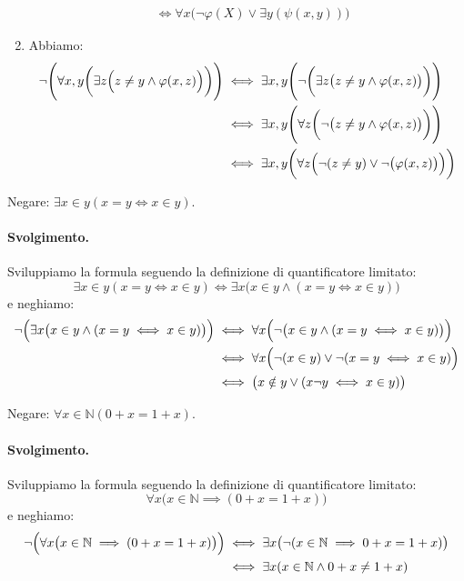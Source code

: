 \begin{enumerate}
\begin{align*}
		&\iff \forall x \biggl(  \neg \varphi(X) \lor \exists y (\psi(x,y)) \biggr)
	\end{align*}
	\item Abbiamo:
	\begin{align*}
		\neg \Biggl( \forall x,y \biggl( \exists z \Bigl( z \neq y \land \varphi(x,z) \Bigr) \biggr)   \Biggr)
		&\iff \exists x,y \Biggl( \neg \biggl( \exists z \bigl(z \neq y \land \varphi(x,z) \bigr)  \biggr)   \Biggr) \\
		&\iff \exists x,y \Biggl( \forall z \biggl(\neg \bigl( z \neq y \land \varphi(x,z)  \bigr)    \biggr)   \Biggr) \\
		& \iff \exists x,y \biggl( \forall z \Bigl( \neg (z \neq y) \lor \neg \bigl(\varphi(x,z)\bigr)  \Bigr)   \biggr)
	\end{align*}
\end{enumerate}
\begin{flushright}
	\blacksquare
\end{flushright}
\begin{exsbox}
	Negare: $\exists x \in y (x=y \iff x \in y)$.
\end{exsbox}
\paragraph{Svolgimento.} Sviluppiamo la formula seguendo la definizione di quantificatore limitato:
\begin{displaymath}
	\exists x \in y (x=y \iff x \in y) \iff \exists x \bigl(x \in y \land (x=y \iff x \in y)\bigr)
\end{displaymath}
e neghiamo:
\begin{align*}
	\neg \Bigl(\exists x \bigl(x \in y \land (x=y \iff x \in y)\bigr)\Bigr) &\iff \forall x \Bigl(\neg \bigl(x \in y \land (x=y \iff x \in y)\bigr)\Bigr) \\
	&\iff \forall x \Bigl(\neg(x \in y) \lor \neg (x=y \iff x \in y)\Bigr)\\
	&\iff \bigl(x \notin y \lor (x\neg y \iff x \in y)\bigr)
\end{align*}
\hfill \blacksquare
\begin{exsbox}
	Negare: $\forall x \in \mathbb{N}(0+x=1+x)$.
\end{exsbox}
\paragraph{Svolgimento.} Sviluppiamo la formula seguendo la definizione di quantificatore limitato:
\begin{displaymath}
	\forall x \bigl(x \in \mathbb{N} \implies (0+x=1+x)\bigr)
\end{displaymath}
e neghiamo:
\begin{align*}
	\neg \Bigl(	\forall x \bigl(x \in \mathbb{N} \implies (0+x=1+x)\bigr)\Bigr) &\iff \exists x \bigl(\neg (x \in \mathbb{N} \implies 0+x=1+x)\bigr) \\
	&\iff \exists x (x \in \mathbb{N} \land 0+x \neq 1+x)
\end{align*}
\hfill \blacksquare